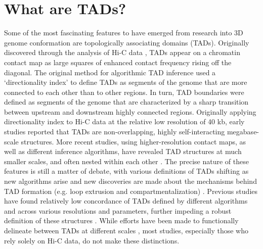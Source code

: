 \section{What are TADs?}
Some of the most fascinating features to have emerged from research into 3D genome conformation are topologically associating domains (TADs). Originally discovered through the analysis of Hi-C data \cite{Dixon.2012, Nora.2012, Hou.2012, Sexton.2012}, TADs appear on a chromatin contact map as large squares of enhanced contact frequency rising off the diagonal. The original method for algorithmic TAD inference used a `directionality index' \cite{Dixon.2012} to define TADs as segments of the genome that are more connected to each other than to other regions.  In turn, TAD boundaries were defined as segments of the genome that are characterized by a sharp transition between upstream and downstream highly connected regions. Originally applying directionality index to Hi-C data at the relative low resolution of 40 kb, early studies reported that TADs are non-overlapping, highly self-interacting megabase-scale structures. More recent studies, using higher-resolution contact maps, as well as different inference algorithms, have revealed TAD structures at much smaller scales, and often nested within each other \cite{Phillips-Cremins.2013, Berlivet.2013, Rao.2014}. The precise nature of these features is still a matter of debate, with various definitions of TADs shifting as new algorithms arise and new discoveries are made about the mechanisms behind TAD formation (e.g. loop extrusion and compartmentalization) \cite{Phillips-Cremins.2013, Rao.2014, Filippova.2014, Dixon.2016, Zhan.2017, Nuebler.2018, Fudenberg.2016, Sanborn.2015}. Previous studies have found relatively low concordance of TADs defined by different algorithms and across various resolutions and parameters, further impeding a robust definition of these structures \cite{Dali.2017, Forcato.2017, Zufferey.2018}. While efforts have been made to functionally delineate between TADs at different scales \cite{Dixon.2016, Beagan.2020, Sikorska.2019, Szabo.2019}, most studies, especially those who rely solely on Hi-C data, do not make these distinctions.

